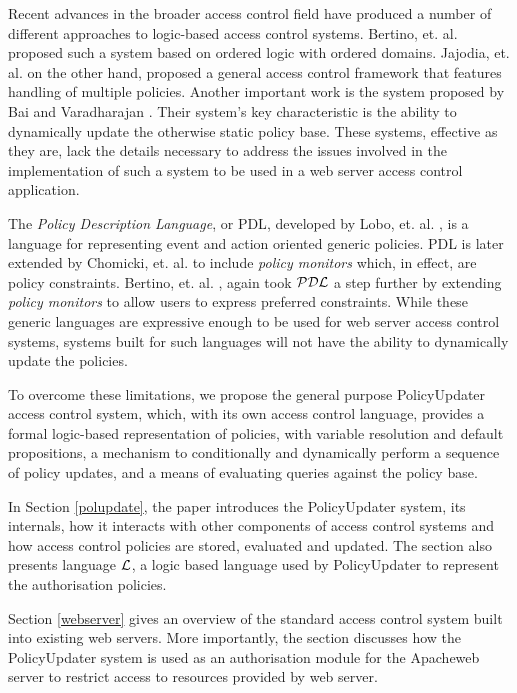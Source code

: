 \documentclass[11pt]{llncs}
\begin{document}
    Recent advances in the broader access control field have produced a number
    of different approaches to logic-based access control systems. Bertino, et.
    al. \cite{BE1} proposed such a system based on ordered logic with ordered
    domains. Jajodia, et. al. \cite{JAJ} on the other hand, proposed a general
    access control framework that features handling of multiple policies.
    Another important work is the system proposed by Bai and Varadharajan
    \cite{BA1,BA2}. Their system's key characteristic is the ability to
    dynamically update the otherwise static policy base. These systems,
    effective as they are, lack the details necessary to address the issues
    involved in the implementation of such a system to be used in a web server
    access control application.

    The {\em Policy Description Language}, or {\cal PDL}, developed by Lobo,
    et. al. \cite{LOB}, is a language for representing event and action
    oriented generic policies. {\cal PDL} is later extended by Chomicki, et.
    al. \cite{CHO} to include {\em policy monitors} which, in effect, are
    policy constraints. Bertino, et. al. \cite{BE2}, again took ${\cal PDL}$ a
    step further by extending {\em policy monitors} to allow users to express
    preferred constraints. While these generic languages are expressive enough
    to be used for web server access control systems, systems built for such
    languages will not have the ability to dynamically update the policies.

    To overcome these limitations, we propose the general purpose PolicyUpdater
    access control system, which, with its own access control language,
    provides a formal logic-based representation of policies, with variable
    resolution and default propositions, a mechanism to conditionally and
    dynamically perform a sequence of policy updates, and a means of evaluating
    queries against the policy base.

    In Section \ref{polupdate}, the paper introduces the PolicyUpdater system,
    its internals, how it interacts with other components of access control
    systems and how access control policies are stored, evaluated and updated.
    The section also presents language ${\cal L}$, a logic based language used
    by PolicyUpdater to represent the authorisation policies.

    Section \ref{webserver} gives an overview of the standard access control
    system built into existing web servers. More importantly, the section
    discusses how the PolicyUpdater system is used as an authorisation module
    for the Apache\footnotemark web server to restrict access to resources
    provided by web server.
\end{document}
